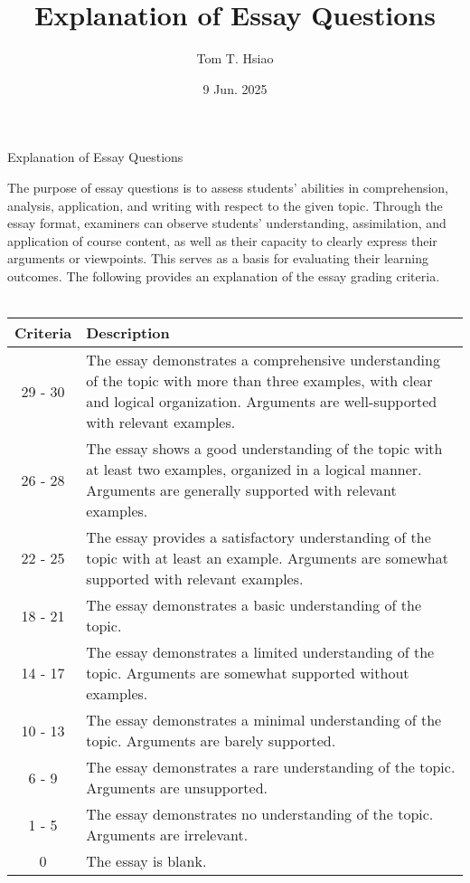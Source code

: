\documentclass{article}
\title{Explanation of Essay Questions}
\author{Tom T. Hsiao}
\date{9 Jun. 2025}
\begin{document}
\thispagestyle{fancy}
\begin{center}
\fontsize{16pt}{16pt}\selectfont Explanation of Essay Questions
\end{center}
\fontsize{14pt}{14pt}\selectfont
The purpose of essay questions is to assess students’ abilities in comprehension, analysis, application, and writing with respect to the given topic. Through the essay format, examiners can observe students’ understanding, assimilation, and application of course content, as well as their capacity to clearly express their arguments or viewpoints. This serves as a basis for evaluating their learning outcomes. The following provides an explanation of the essay grading criteria. \\
\\ \vspace{1em} 
\begin{tabular}{|c|p{15cm}|}
\hline
Criteria & Description \\
\hline
29 - 30 & The essay demonstrates a comprehensive understanding of the topic with more than three examples, with clear and logical organization. Arguments are well-supported with relevant examples. \\
\hline
26 - 28 & The essay shows a good understanding of the topic with at least two examples, organized in a logical manner. Arguments are generally supported with relevant examples. \\
\hline
22 - 25 & The essay provides a satisfactory understanding of the topic with at least an example. Arguments are somewhat supported with relevant examples. \\
\hline
18 - 21 & The essay demonstrates a basic understanding of the topic. \\
\hline
14 - 17 & The essay demonstrates a limited understanding of the topic. Arguments are somewhat supported without examples. \\
\hline
10 - 13 & The essay demonstrates a minimal understanding of the topic. Arguments are barely supported. \\
\hline
6 - 9 & The essay demonstrates a rare understanding of the topic. Arguments are unsupported. \\
\hline
1 - 5 & The essay demonstrates no understanding of the topic. Arguments are irrelevant. \\
\hline
0 & The essay is blank. \\
\hline
\end{tabular}
\end{document}
